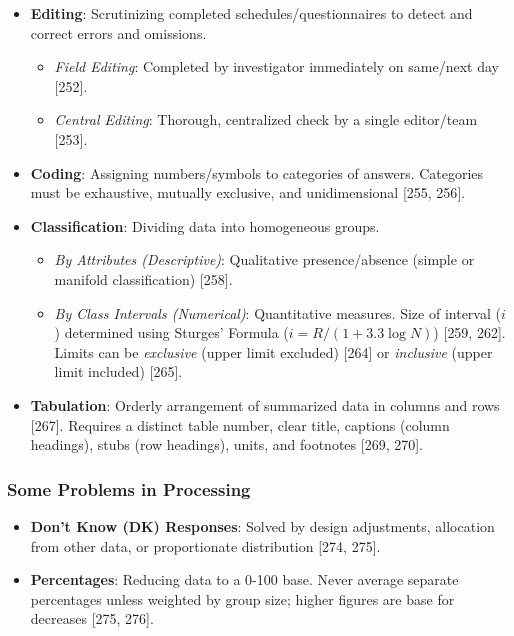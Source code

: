 \documentclass[
]{article}
\providecommand{\tightlist}{%
  \setlength{\itemsep}{0pt}\setlength{\parskip}{0pt}}
\begin{document}
\begin{itemize}
\tightlist
\item
  \textbf{Editing}: Scrutinizing completed schedules/questionnaires to
  detect and correct errors and omissions.

  \begin{itemize}
  \tightlist
  \item
    \emph{Field Editing}: Completed by investigator immediately on
    same/next day {[}252{]}.
  \item
    \emph{Central Editing}: Thorough, centralized check by a single
    editor/team {[}253{]}.
  \end{itemize}
\item
  \textbf{Coding}: Assigning numbers/symbols to categories of answers.
  Categories must be exhaustive, mutually exclusive, and unidimensional
  {[}255, 256{]}.
\item
  \textbf{Classification}: Dividing data into homogeneous groups.

  \begin{itemize}
  \tightlist
  \item
    \emph{By Attributes (Descriptive)}: Qualitative presence/absence
    (simple or manifold classification) {[}258{]}.
  \item
    \emph{By Class Intervals (Numerical)}: Quantitative measures. Size
    of interval (\(i\)) determined using Sturges' Formula
    (\(i = R/(1 + 3.3 \log N)\)) {[}259, 262{]}. Limits can be
    \emph{exclusive} (upper limit excluded) {[}264{]} or
    \emph{inclusive} (upper limit included) {[}265{]}.
  \end{itemize}
\item
  \textbf{Tabulation}: Orderly arrangement of summarized data in columns
  and rows {[}267{]}. Requires a distinct table number, clear title,
  captions (column headings), stubs (row headings), units, and footnotes
  {[}269, 270{]}.
\end{itemize}

\subsubsection{Some Problems in
Processing}\label{some-problems-in-processing}

\begin{itemize}
\tightlist
\item
  \textbf{Don't Know (DK) Responses}: Solved by design adjustments,
  allocation from other data, or proportionate distribution {[}274,
  275{]}.
\item
  \textbf{Percentages}: Reducing data to a 0-100 base. Never average
  separate percentages unless weighted by group size; higher figures are
  base for decreases {[}275, 276{]}.
\end{itemize}
\end{document}

